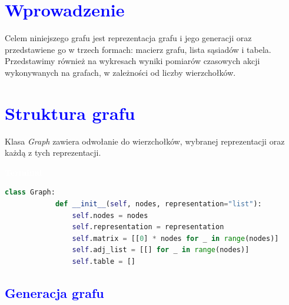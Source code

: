 \documentclass{article}
\begin{document}
	
	
	\newpage
	\titleformat{\section}[block]{\Huge\bfseries}{\thesection}{2em}{}
	\section*{\textcolor{blue}{Wprowadzenie}}
	
	\noindent Celem niniejszego grafu jest reprezentacja grafu i jego generacji oraz przedstawiene go w trzech formach: macierz grafu, lista sąsiadów i tabela. Przedstawimy również na wykresach wyniki pomiarów czasowych akcji wykonywanych na grafach, w zależności od liczby wierzchołków. 

	\section*{\textcolor{blue}{Struktura grafu}}
	
	\begin{multicols}{2}
	\noindent Klasa \textit{Graph} zawiera odwołanie do wierzchołków, wybranej reprezentacji oraz każdą z tych reprezentacji.
	
	\begin{tcolorbox}[colback=black,colframe=gray!50!,arc=3mm,boxrule=0pt,left=0pt,right=0pt,width=\linewidth]
		\textcolor{white}{\textbf{\textsf{Terminal}}}\\
		
		\begin{lstlisting}[language=Python]
		class Graph:
			def __init__(self, nodes, representation="list"):
				self.nodes = nodes
				self.representation = representation
				self.matrix = [[0] * nodes for _ in range(nodes)]
				self.adj_list = [[] for _ in range(nodes)]
				self.table = []
		\end{lstlisting}
		
	\end{tcolorbox}
	\end{multicols}
	\subsection*{\textcolor{blue}{Generacja grafu}}
	
\end{document}
